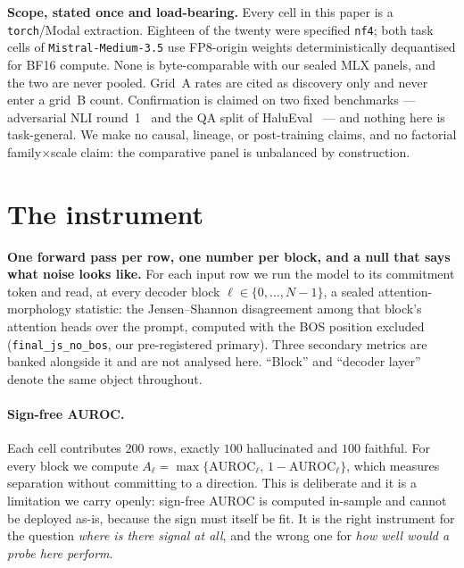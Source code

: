 \documentclass[10pt, letterpaper]{article}
\begin{document}
\textbf{Scope, stated once and load-bearing.} Every cell in this paper is a
\texttt{torch}/Modal extraction. Eighteen of the twenty were specified
\texttt{nf4}; both task cells of \texttt{Mistral-Medium-3.5} use FP8-origin weights
deterministically dequantised for BF16 compute. None is byte-comparable with our
sealed MLX panels, and the two are never pooled. Grid~A rates are cited as discovery only and never enter a grid~B count.
Confirmation is claimed on two fixed benchmarks --- adversarial NLI
round~1~\citep{anli} and the QA split of HaluEval~\citep{halueval} --- and
nothing here is task-general. We make no causal,
lineage, or post-training claims, and no factorial family$\times$scale claim: the
comparative panel is unbalanced by construction.

\section{The instrument}
\label{sec:instrument}

\textbf{One forward pass per row, one number per block, and a null that says what
noise looks like.} For each input row we run the model to its commitment token
and read, at every decoder block $\ell \in \{0, \dots, N-1\}$, a sealed
attention-morphology statistic: the Jensen--Shannon disagreement among that
block's attention heads over the prompt, computed with the BOS position excluded
(\texttt{final\_js\_no\_bos}, our pre-registered primary). Three secondary
metrics are banked alongside it and are not analysed here. ``Block'' and
``decoder layer'' denote the same object throughout.

\paragraph{Sign-free AUROC.} Each cell contributes $200$ rows, exactly
$100$ hallucinated and $100$ faithful. For every block we compute
$A_\ell = \max\{\mathrm{AUROC}_\ell,\, 1-\mathrm{AUROC}_\ell\}$, which measures
separation without committing to a direction. This is deliberate and it is a
limitation we carry openly: sign-free AUROC is computed in-sample and cannot be
deployed as-is, because the sign must itself be fit. It is the right instrument
for the question \emph{where is there signal at all}, and the wrong one for
\emph{how well would a probe here perform}.
\end{document}
